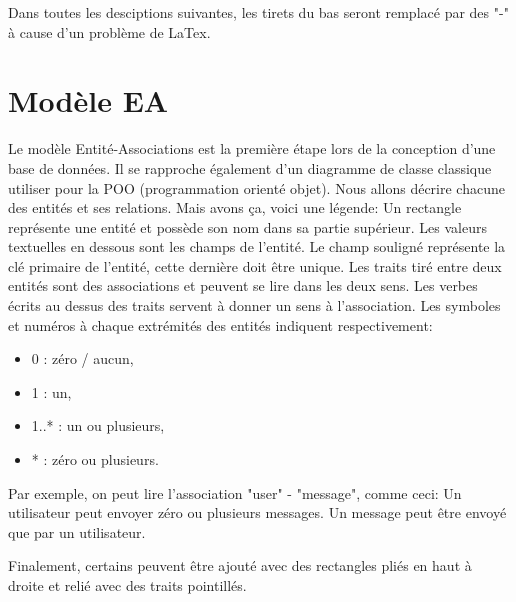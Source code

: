 \documentclass[
    iai, %
    il, %
]{heig-tb}
\begin{document}
Dans toutes les desciptions suivantes, les tirets du bas seront remplacé par des "-" à cause d'un problème de LaTex.

\section{Modèle EA}
Le modèle Entité-Associations est la première étape lors de la conception d'une base de données. Il se rapproche également d'un diagramme de classe classique utiliser pour la POO (programmation orienté objet).\newline
Nous allons décrire chacune des entités et ses relations.\newline
Mais avons ça, voici une légende:\newline
Un rectangle représente une entité et possède son nom dans sa partie supérieur.\newline
Les valeurs textuelles en dessous sont les champs de l'entité. Le champ souligné représente la clé primaire de l'entité, cette dernière doit être unique.\newline
Les traits tiré entre deux entités sont des associations et peuvent se lire dans les deux sens. Les verbes écrits au dessus des traits servent à donner un sens à l'association.\newline
Les symboles et numéros à chaque extrémités des entités indiquent respectivement:
\begin{itemize}
    \item 0 : zéro / aucun,
    \item 1 : un,
    \item 1..* : un ou plusieurs,
    \item * : zéro ou plusieurs.
\end{itemize}

Par exemple, on peut lire l'association "user" - "message", comme ceci:\newline
Un utilisateur peut envoyer zéro ou plusieurs messages.\newline
Un message peut être envoyé que par un utilisateur.

Finalement, certains peuvent être ajouté avec des rectangles pliés en haut à droite et relié avec des traits pointillés.
\end{document}

